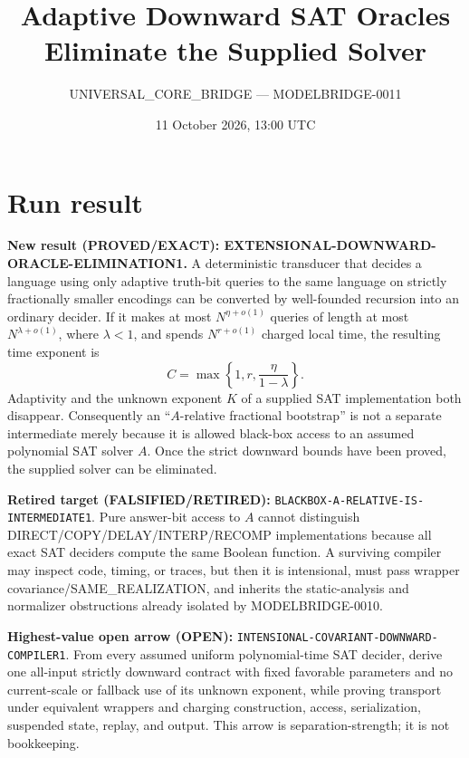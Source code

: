 \documentclass[11pt]{article}
\title{Adaptive Downward SAT Oracles Eliminate the Supplied Solver}
\author{UNIVERSAL\_CORE\_BRIDGE --- MODELBRIDGE-0011}
\date{11 October 2026, 13:00 UTC}
\newcommand{\OPEN}{\textbf{OPEN}}
\newcommand{\EXACT}{\textbf{PROVED/EXACT}}
\begin{document}
\maketitle

\begin{center}
\end{center}

\section*{Run result}

\textbf{New result (\EXACT): EXTENSIONAL-DOWNWARD-ORACLE-ELIMINATION1.}
A deterministic transducer that decides a language using only adaptive truth-bit
queries to the same language on strictly fractionally smaller encodings can be
converted by well-founded recursion into an ordinary decider.  If it makes at
most $N^{\eta+o(1)}$ queries of length at most $N^{\lambda+o(1)}$, where
$\lambda<1$, and spends $N^{r+o(1)}$ charged local time, the resulting time
exponent is
\[
 C=\max\left\{1,r,\frac{\eta}{1-\lambda}\right\}.
\]
Adaptivity and the unknown exponent $K$ of a supplied SAT implementation both
disappear.  Consequently an ``$A$-relative fractional bootstrap'' is not a
separate intermediate merely because it is allowed black-box access to an
assumed polynomial SAT solver $A$.  Once the strict downward bounds have been
proved, the supplied solver can be eliminated.

\textbf{Retired target (\textbf{FALSIFIED/RETIRED}):}
\texttt{BLACKBOX-A-RELATIVE-IS-INTERMEDIATE1}.  Pure answer-bit access to $A$
cannot distinguish DIRECT/COPY/DELAY/INTERP/RECOMP implementations because all
exact SAT deciders compute the same Boolean function.  A surviving compiler may
inspect code, timing, or traces, but then it is intensional, must pass wrapper
covariance/SAME\_REALIZATION, and inherits the static-analysis and normalizer
obstructions already isolated by MODELBRIDGE-0010.

\textbf{Highest-value open arrow (\OPEN):}
\texttt{INTENSIONAL-COVARIANT-DOWNWARD-COMPILER1}.  From every assumed uniform
polynomial-time SAT decider, derive one all-input strictly downward contract
with fixed favorable parameters and no current-scale or fallback use of its
unknown exponent, while proving transport under equivalent wrappers and
charging construction, access, serialization, suspended state, replay, and
output.  This arrow is separation-strength; it is not bookkeeping.
\end{document}
